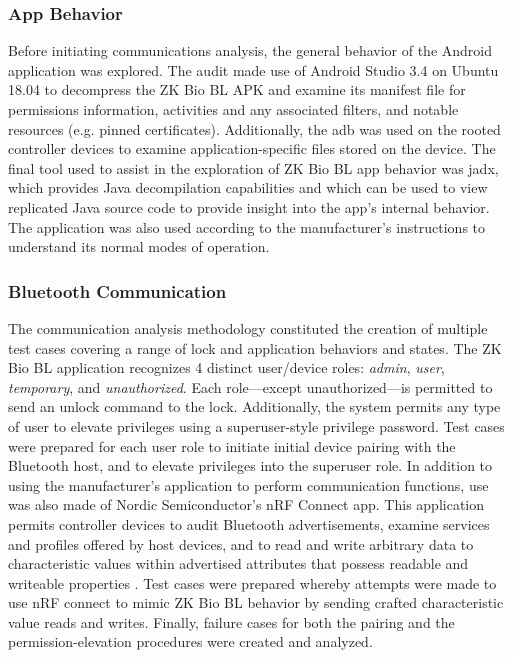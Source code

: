 \documentclass[conference]{IEEEtran}
\begin{document}
\bigskip
\subsubsection{App Behavior}

Before initiating communications analysis, the general behavior of the Android application was explored.  The audit made use of Android Studio 3.4 on Ubuntu 18.04 to decompress the ZK Bio BL APK and examine its manifest file for permissions information, activities and any associated filters, and notable resources (e.g. pinned certificates).  Additionally, the \gls{adb} was used on the rooted controller devices to examine application-specific files stored on the device.  The final tool used to assist in the exploration of ZK Bio BL app behavior was jadx, which provides Java decompilation capabilities  \cite{Skylot2018} and which can be used to view replicated Java source code to provide insight into the app's internal behavior.  The application was also used according to the manufacturer's instructions to understand its normal modes of operation.

\bigskip
\subsubsection{Bluetooth Communication}

The communication analysis methodology constituted the creation of multiple test cases covering a range of lock and application behaviors and states.  The ZK Bio BL application recognizes 4 distinct user/device roles: \textit{admin}, \textit{user}, \textit{temporary}, and \textit{unauthorized}.  Each role---except unauthorized---is permitted to send an unlock command to the lock.  Additionally, the system permits any type of user to elevate privileges using a superuser-style privilege password.  Test cases were prepared for each user role to initiate initial device pairing with the Bluetooth host, and to elevate privileges into the superuser role.  In addition to using the manufacturer's application to perform communication functions, use was also made of Nordic Semiconductor's nRF Connect app.  This application permits controller devices to audit Bluetooth advertisements, examine services and profiles offered by host devices, and to read and write arbitrary data to characteristic values within advertised attributes that possess readable and writeable properties \cite{NordicSemiconductor}.  Test cases were prepared whereby attempts were made to use nRF connect to mimic ZK Bio BL behavior by sending crafted characteristic value reads and writes.  Finally, failure cases for both the pairing and the permission-elevation procedures were created and analyzed.
\end{document}
